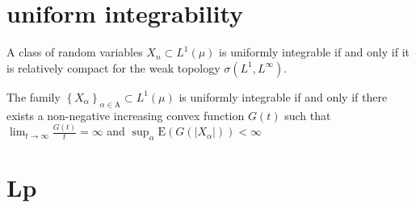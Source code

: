 \section{uniform integrability}
\begin{theorem} 
A class of random variables $X_{n} \subset L^{1}(\mu)$ is uniformly integrable if and only if it is relatively compact for the weak topology $\sigma\left(L^{1}, L^{\infty}\right)$.
\end{theorem}
\begin{theorem} 
The family $\left\{X_{\alpha}\right\}_{\alpha \in \mathrm{A}} \subset L^{1}(\mu)$ is uniformly integrable if and only if there exists a non-negative increasing convex function $G(t)$ such that $\lim _{t \rightarrow \infty} \frac{G(t)}{t}=\infty$ and $\sup _{\alpha} \mathrm{E}\left(G\left(\left|X_{\alpha}\right|\right)\right)<\infty$
\end{theorem}
\section{Lp}

